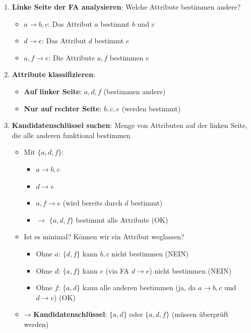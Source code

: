 \documentclass[a4paper]{article}
\begin{document}
\begin{enumerate}
    \item \textbf{Linke Seite der FA analysieren}: Welche Attribute bestimmen andere?
    \begin{itemize}
        \item $a \to b, c$: Das Attribut $a$ bestimmt $b$ und $c$
        \item $d \to e$: Das Attribut $d$ bestimmt $e$
        \item $a, f \to e$: Die Attribute $a, f$ bestimmen $e$
    \end{itemize}
    
    \item \textbf{Attribute klassifizieren}:
    \begin{itemize}
        \item \textbf{Auf linker Seite}: $a, d, f$ (bestimmen andere)
        \item \textbf{Nur auf rechter Seite}: $b, c, e$ (werden bestimmt)
    \end{itemize}
    
    \item \textbf{Kandidatenschlüssel suchen}: Menge von Attributen auf der linken Seite, 
    die alle anderen funktional bestimmen
    \begin{itemize}
        \item Mit $\{a, d, f\}$:
        \begin{itemize}
            \item $a \to b, c$
            \item $d \to e$
            \item $a, f \to e$ (wird bereits durch $d$ bestimmt)
            \item $\to$ $\{a, d, f\}$ bestimmt alle Attribute (OK)
        \end{itemize}
        
        \item Ist es minimal? Können wir ein Attribut weglassen?
        \begin{itemize}
            \item Ohne $a$: $\{d, f\}$ kann $b, c$ nicht bestimmen (NEIN)
            \item Ohne $d$: $\{a, f\}$ kann $e$ (via FA $d \to e$) nicht bestimmen (NEIN)
            \item Ohne $f$: $\{a, d\}$ kann alle anderen bestimmen (ja, da $a \to b,c$ und $d \to e$) (OK)
        \end{itemize}
        
        \item → \textbf{Kandidatenschlüssel}: $\{a, d\}$ oder $\{a, d, f\}$ (müssen überprüft werden)
    \end{itemize}
\end{enumerate}
\end{document}
